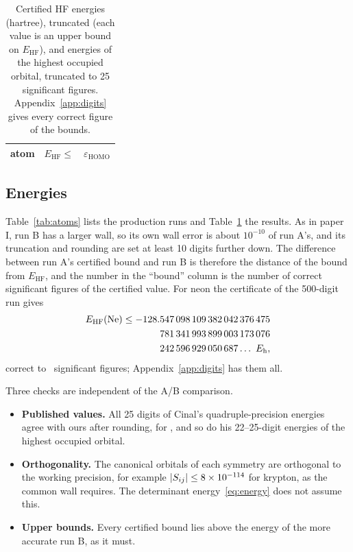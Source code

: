 \documentclass[aps,pra,reprint,superscriptaddress,amsmath,amssymb,longbibliography]{revtex4-2}
\newcommand{\eh}{E_\mathrm{h}}
\newcommand{\EHF}{E_\mathrm{HF}}
\begin{document}
\begin{table}[t]
\caption{Certified HF energies (hartree), truncated (each value is an upper bound on $\EHF$), and energies of the highest occupied orbital, truncated to 25 significant figures. Appendix~\ref{app:digits} gives every correct figure of the bounds.}
\label{tab:energies}
\footnotesize
\begin{ruledtabular}
\begin{tabular}{lll}
atom & $\EHF\le{}$ & $\varepsilon_\mathrm{HOMO}$ \\
\hline

\end{tabular}
\end{ruledtabular}
\end{table}

\subsection{Energies}

Table~\ref{tab:atoms} lists the production runs and Table~\ref{tab:energies} the results. As in paper I, run B has a larger wall, so its own wall error is about $10^{-10}$ of run A's, and its truncation and rounding are set at least 10 digits further down. The difference between run A's certified bound and run B is therefore the distance of the bound from $\EHF$, and the number in the ``bound'' column is the number of correct significant figures of the certified value. For neon the certificate of the 500-digit run gives
\begin{equation}
\begin{split}
\EHF(\mathrm{Ne})\le{}&\NeEsplit\ldots\ \eh ,
\end{split}\label{eq:nebound}
\end{equation}
correct to \NeNsf\ significant figures; Appendix~\ref{app:digits} has them all.

Three checks are independent of the A/B comparison.
\begin{itemize}
\item \textbf{Published values.} All 25 digits of Cinal's quadruple-precision energies~\cite{Cinal2020} agree with ours after rounding, for \CinalAgree, and so do his 22--25-digit energies of the highest occupied orbital.
\item \textbf{Orthogonality.} The canonical orbitals of each symmetry are orthogonal to the working precision, for example $|S_{ij}|\le8\times10^{-114}$ for krypton, as the common wall requires. The determinant energy~\eqref{eq:energy} does not assume this.
\item \textbf{Upper bounds.} Every certified bound lies above the energy of the more accurate run B, as it must.
\end{itemize}
\end{document}
